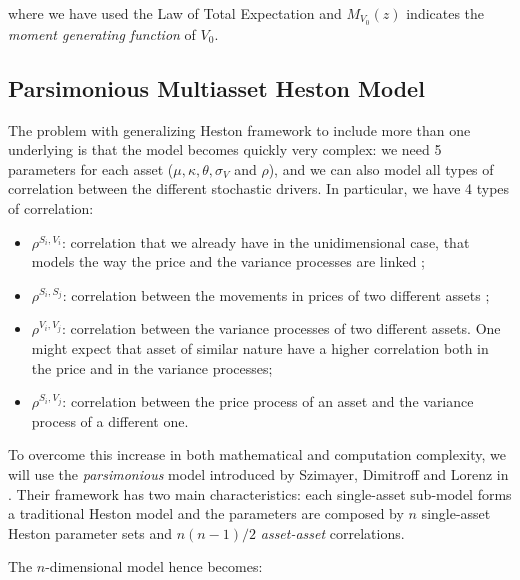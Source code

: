 where we have used the Law of Total Expectation and $M_{V_0}(z)$ indicates the \textit{moment generating function} of $V_0$.



\subsection{Parsimonious Multiasset Heston Model}
The problem with generalizing Heston framework to include more than one underlying is that the model becomes quickly very complex: we need 5 parameters for each asset ($\mu, \kappa,\theta, \sigma_V$ and $ \rho$), and we can also model all types of correlation between the different stochastic drivers. In particular, we have 4 types of correlation: 
\begin{itemize}
	\item $ \rho^{S_i , V_i}$:  correlation that we already have in the unidimensional case, that models the way the price and the variance processes are linked ;
	\item $ \rho^{S_i , S_j}$: correlation between the movements in prices of two different assets ;
	\item $\rho^{V_i , V_j} $: correlation between the variance processes of two different assets. One might expect that asset of similar nature have a higher correlation both in the price and in the variance processes;
	\item $\rho^{S_i , V_j} $: correlation between the price process of an asset and the variance process of a different one.
\end{itemize}

To overcome this increase in both mathematical and computation complexity, we will use the \textit{parsimonious} model introduced by Szimayer, Dimitroff and Lorenz in \cite{PARSIMONIOUS2011}. Their framework has two main characteristics: each single-asset sub-model forms a traditional Heston model and the parameters are  composed by $n$ single-asset Heston parameter sets and $n (n-1)/2$  \textit{asset-asset} correlations.

The $n$-dimensional model  hence becomes:


